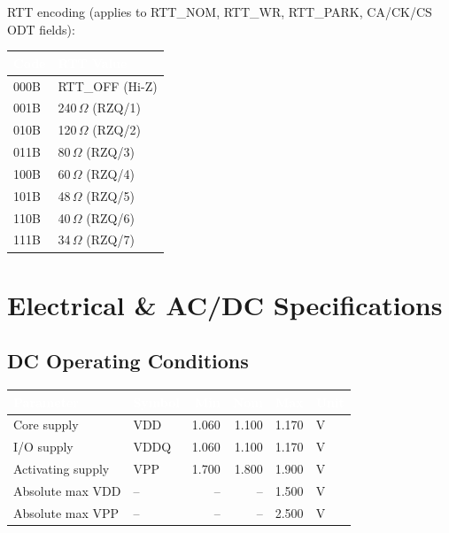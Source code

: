\documentclass[10pt,a4paper,twoside]{article}
\newcommand{\thd}[1]{\cellcolor{navyblue}\textcolor{white}{\textbf{#1}}}
\newcommand{\trow}{\rowcolor{lightgray}}
\newcommand{\talt}{\rowcolor{skyblue!30}}
\begin{document}
RTT encoding (applies to RTT\_NOM, RTT\_WR, RTT\_PARK, CA/CK/CS ODT fields):

\begin{center}
\begin{tabularx}{0.6\linewidth}{@{} l l @{}}
\toprule
\thd{Code} & \thd{RTT Value} \\
\midrule
\trow 000B & RTT\_OFF (Hi-Z) \\
\talt 001B & 240\,$\Omega$ (RZQ/1) \\
\trow 010B & 120\,$\Omega$ (RZQ/2) \\
\talt 011B & 80\,$\Omega$ (RZQ/3) \\
\trow 100B & 60\,$\Omega$ (RZQ/4) \\
\talt 101B & 48\,$\Omega$ (RZQ/5) \\
\trow 110B & 40\,$\Omega$ (RZQ/6) \\
\talt 111B & 34\,$\Omega$ (RZQ/7) \\
\bottomrule
\end{tabularx}
\end{center}

\section{Electrical \& AC/DC Specifications}

\subsection{DC Operating Conditions}

\begin{center}
\begin{tabularx}{0.85\linewidth}{@{} l l r r r l @{}}
\toprule
\thd{Parameter} & \thd{Symbol} & \thd{Min} & \thd{Nom} & \thd{Max} & \thd{Unit} \\
\midrule
\trow Core supply & VDD & 1.060 & 1.100 & 1.170 & V \\
\talt I/O supply & VDDQ & 1.060 & 1.100 & 1.170 & V \\
\trow Activating supply & VPP & 1.700 & 1.800 & 1.900 & V \\
\talt Absolute max VDD & -- & -- & -- & 1.500 & V \\
\trow Absolute max VPP & -- & -- & -- & 2.500 & V \\
\bottomrule
\end{tabularx}
\end{center}
\end{document}
